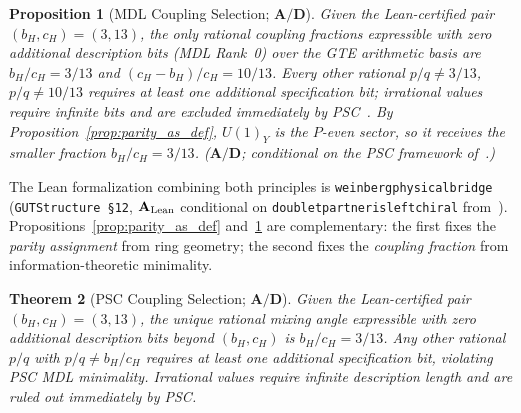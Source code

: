 \documentclass[11pt]{article}
\newtheorem{theorem}{Theorem}[section]
\newtheorem{proposition}[theorem]{Proposition}
\theoremstyle{remark}
\newcommand{\bH}{b_H}
\newcommand{\cH}{c_H}
\newcommand{\lean}[1]{%
  \penalty-100
  \begingroup\def\_{\textunderscore\allowbreak}\texttt{#1}\endgroup}
\newcommand{\CatAL}{\ensuremath{\textbf{A}_{\rm Lean}}}
\newcommand{\CatAD}{\textbf{A/D}}
\begin{document}
\begin{proposition}[MDL Coupling Selection; $\CatAD$]
\label{prop:mdl_selection}
Given the Lean-certified pair $(\bH, \cH) = (3, 13)$, the only rational coupling
fractions expressible with zero additional description bits (MDL Rank~0) over the
GTE arithmetic basis are $\bH/\cH = 3/13$ and $(\cH - \bH)/\cH = 10/13$.
Every other rational $p/q \neq 3/13$, $p/q \neq 10/13$ requires at least one
additional specification bit; irrational values require infinite bits and are
excluded immediately by PSC~\cite{Spivack2025_UGPUniqueness}.
By Proposition~\ref{prop:parity_as_def}, $U(1)_Y$ is the $P$-even sector, so it
receives the smaller fraction $\bH/\cH = 3/13$.
($\CatAD$; conditional on the PSC framework of~\cite{Spivack2025_UGPUniqueness}.)
\end{proposition}

The Lean formalization combining both principles is \lean{weinberg\_physical\_bridge}
(\texttt{GUTStructure~\S12}, $\CatAL$ conditional on
\lean{doublet\_partner\_is\_left\_chiral} from~\cite{Spivack2026_UGPDynamics}).
Propositions~\ref{prop:parity_as_def} and~\ref{prop:mdl_selection} are complementary:
the first fixes the \emph{parity assignment} from ring geometry; the second fixes the
\emph{coupling fraction} from information-theoretic minimality.

\begin{theorem}[PSC Coupling Selection; $\CatAD$]
\label{thm:psc}
Given the Lean-certified pair $(\bH, \cH) = (3, 13)$, the unique rational mixing angle
expressible with zero additional description bits beyond $(\bH, \cH)$ is $\bH/\cH = 3/13$.
Any other rational $p/q$ with $p/q \neq \bH/\cH$ requires at least one additional
specification bit, violating PSC MDL minimality.  Irrational values require infinite
description length and are ruled out immediately by PSC.
\end{theorem}
\end{document}
